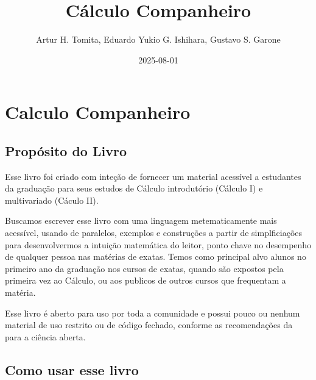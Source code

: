 \documentclass[
  portuguese,
  letterpaper,
  DIV=11,
  numbers=noendperiod]{scrreport}
\title{Cálculo Companheiro}
\author{Artur H. Tomita, Eduardo Yukio G. Ishihara, Gustavo S. Garone}
\date{2025-08-01}
\renewcommand*\contentsname{Índice}
\newcommand\contentsname{Índice}
\begin{document}
\maketitle

\renewcommand*\contentsname{Índice}
{
\hypersetup{linkcolor=}
\setcounter{tocdepth}{2}
\tableofcontents
}


\chapter*{Calculo Companheiro}\label{calculo-companheiro}


\newcommand{\pt}[3]{\frac{\partial^2{#1}}{\partial{#2}\partial{#3}}}
\newcommand{\ptd}[3]{\left. \frac{\partial^2{#1}}{\partial{#2}\partial{#3}} \right \rvert_{(x_0,y_0)}}

\section*{Propósito do Livro}\label{propuxf3sito-do-livro}


Esse livro foi criado com inteção de fornecer um material acessível a
estudantes da graduação para seus estudos de Cálculo introdutório
(Cálculo I) e multivariado (Cáculo II).

Buscamos escrever esse livro com uma linguagem metematicamente mais
acessível, usando de paralelos, exemplos e construções a partir de
simplficiações para desenvolvermos a intuição matemática do leitor,
ponto chave no desempenho de qualquer pessoa nas matérias de exatas.
Temos como principal alvo alunos no primeiro ano da graduação nos cursos
de exatas, quando são expostos pela primeira vez ao Cálculo, ou aos
publicos de outros cursos que frequentam a matéria.

Esse livro é aberto para uso por toda a comunidade e possui pouco ou
nenhum material de uso restrito ou de código fechado, conforme as
recomendações da \textcite{unesco_recomendacao_2022} para a ciência
aberta.

\section*{Como usar esse livro}\label{como-usar-esse-livro}
\end{document}
